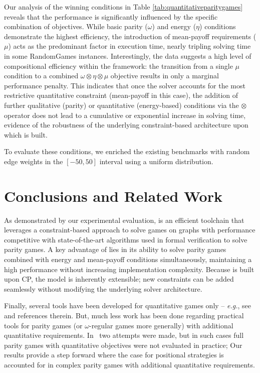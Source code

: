 \documentclass[runningheads]{llncs}
\begin{document}
Our analysis of the winning conditions in Table \ref{tab:quantitativeparitygames} reveals that the performance is significantly influenced by the specific combination of objectives. While basic parity ($\omega$) and energy ($\eta$) conditions demonstrate the highest efficiency, the introduction of mean-payoff requirements ($\mu$) acts as the predominant factor in execution time, nearly tripling solving time in some RandomGames instances. Interestingly, the data suggests a high level of compositional efficiency within the \nocq framework: the transition from a single $\mu$ condition to a combined $\omega \otimes \eta \otimes \mu$ objective results in only a marginal performance penalty. This indicates that once the solver accounts for the most restrictive quantitative constraint (mean-payoff in this case), the addition of further qualitative (parity) or quantitative (energy-based) conditions via the $\otimes$ operator does not lead to a cumulative or exponential increase in solving time, evidence of the robustness of the underlying constraint-based architecture upon which \nocq is built. 

To evaluate these conditions, we enriched the existing benchmarks with random edge weights in the $[-50, 50]$ interval using a uniform distribution.

\section{Conclusions and Related Work} 

As demonstrated by our experimental evaluation, \nocq is an efficient toolchain that leverages a constraint-based approach to solve games on graphs with performance competitive with state-of-the-art algorithms used in formal verification to solve parity games. A key advantage of \nocq lies in its ability to solve parity games combined with energy and mean-payoff conditions simultaneously, maintaining a high performance without increasing implementation complexity.
%
Because \nocq is built upon CP, the model is inherently extensible; new constraints can be added seamlessly without modifying the underlying solver architecture. 

Finally, several tools have been developed for quantitative games only -- {\em e.g.}, see~\cite{BenerecettiDM24} and references therein. But, much less work has been done regarding practical tools for parity games (or $\omega$-regular games more generally) with additional quantitative requirements. 
%
In~\cite{ChatterjeeHJS11,DziadekFS25} two attempts were made, but in such cases full parity games with quantitative objectives were not evaluated in practice; Our results provide a step forward where the case for positional strategies is accounted for in complex parity games with additional quantitative requirements.  
\end{document}
